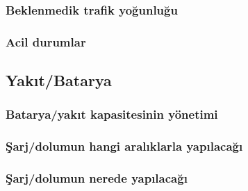 \subsubsection{Beklenmedik trafik yoğunluğu}
\subsubsection{Acil durumlar}

\subsection{Yakıt/Batarya}
\subsubsection{Batarya/yakıt kapasitesinin yönetimi}
\subsubsection{Şarj/dolumun hangi aralıklarla yapılacağı}
\subsubsection{Şarj/dolumun nerede yapılacağı}


\newpage

\printbibliography
    

